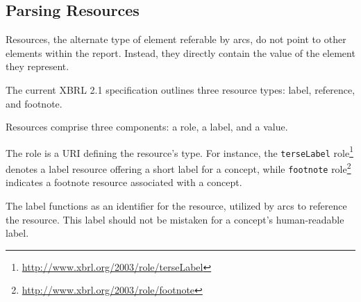 





\subsection{Parsing Resources}

Resources, the alternate type of element referable by arcs, do not point to other elements within the report.
Instead, they directly contain the value of the element they represent.

The current XBRL 2.1 specification outlines three resource types: label, reference, and footnote.

Resources comprise three components: a role, a label, and a value.

The role is a URI defining the resource's type.
For instance, the \texttt{terseLabel} role\footnote{\url{http://www.xbrl.org/2003/role/terseLabel}} 
denotes a label resource offering a short label for a concept,
while \texttt{footnote} role\footnote{\url{http://www.xbrl.org/2003/role/footnote}}
indicates a footnote resource associated with a concept.

The label functions as an identifier for the resource, utilized by arcs to reference the resource.
This label should not be mistaken for a concept's human-readable label.


